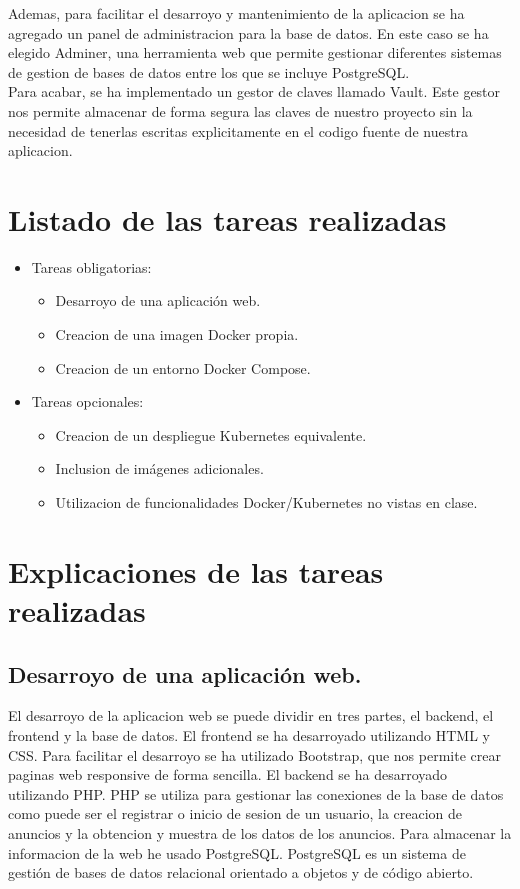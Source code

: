 \documentclass{report}
\begin{document}
        Ademas, para facilitar el desarroyo y mantenimiento de la aplicacion se ha agregado un panel de administracion para la base de datos.
        En este caso se ha elegido Adminer, una herramienta web que permite gestionar diferentes sistemas de gestion de bases de datos entre los que se incluye PostgreSQL.\\

        Para acabar, se ha implementado un gestor de claves llamado Vault. Este gestor nos permite almacenar de forma segura las claves de nuestro proyecto sin la necesidad de tenerlas escritas explicitamente en el codigo fuente de nuestra aplicacion.
    \chapter{Listado de las tareas realizadas}
        \begin{itemize}
            \item Tareas obligatorias:
            \begin{itemize}
                \item Desarroyo de una aplicación web. \checkmark
                \item Creacion de una imagen Docker propia. \checkmark
                \item Creacion de un entorno Docker Compose. \checkmark
            \end{itemize}
            \item Tareas opcionales:
            \begin{itemize}
                \item Creacion de un despliegue Kubernetes equivalente. \checkmark
                \item Inclusion de imágenes adicionales. \checkmark
                \item Utilizacion de funcionalidades Docker/Kubernetes no vistas en clase. \checkmark
            \end{itemize}
        \end{itemize}
    \chapter{Explicaciones de las tareas realizadas}
        \section{Desarroyo de una aplicación web.}
            El desarroyo de la aplicacion web se puede dividir en tres partes, el backend, el frontend y la base de datos.
            El frontend se ha desarroyado utilizando HTML y CSS.
            Para facilitar el desarroyo se ha utilizado Bootstrap, que nos permite crear paginas web responsive de forma sencilla.
            El backend se ha desarroyado utilizando PHP.
            PHP se utiliza para gestionar las conexiones de la base de datos como puede ser el registrar o inicio de sesion de un usuario, la creacion de anuncios y la obtencion y muestra de los datos de los anuncios.
            Para almacenar la informacion de la web he usado PostgreSQL.
            PostgreSQL es un sistema de gestión de bases de datos relacional orientado a objetos y de código abierto.\\
\end{document}
